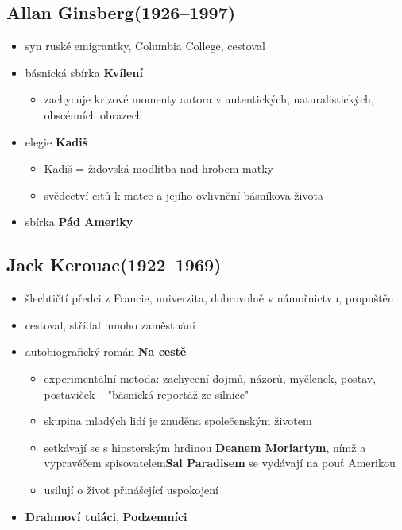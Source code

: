 \subsection{Allan Ginsberg(1926--1997)}
\begin{itemize}
\item syn ruské emigrantky, Columbia College, cestoval
\item básnická sbírka \textbf{Kvílení}
	\begin{itemize}
	\item zachycuje krizové momenty autora v autentických, naturalistických, obscénních obrazech
	\end{itemize}
\item elegie \textbf{Kadiš} 
	\begin{itemize}
	\item Kadiš = židovská modlitba nad hrobem matky
	\item svědectví citů k matce a jejího ovlivnění básníkova života
	\end{itemize}
\item sbírka \textbf{Pád Ameriky}
\end{itemize}

\subsection{Jack Kerouac(1922--1969)}
\begin{itemize}
\item šlechtičtí předci z Francie, univerzita, dobrovolně v námořnictvu, propuštěn
\item cestoval, střídal mnoho zaměstnání
\item autobiografický román \textbf{Na cestě}
	\begin{itemize}
	\item experimentální metoda: zachycení dojmů, názorů, myělenek, postav, postaviček -- "básnická reportáž ze silnice"
	\item skupina mladých lidí je znuděna společenským životem
	\item setkávají se s hipsterským hrdinou \textbf{Deanem Moriartym}, nímž a vypravěčem spisovatelem\textbf{Sal Paradisem} se vydávají na pouť Amerikou
	\item usilují o život přinášející uspokojení 
	\end{itemize}
\item \textbf{Drahmoví tuláci}, \textbf{Podzemníci}
\end{itemize}

